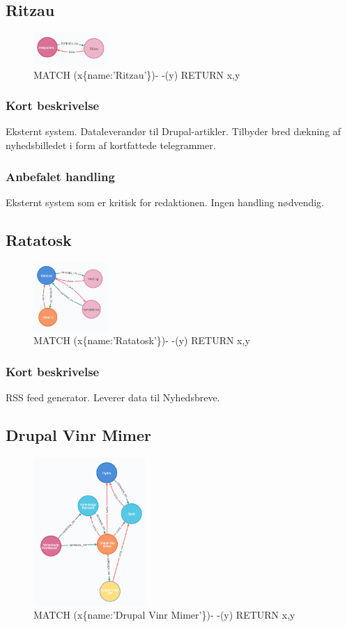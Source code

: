 \documentclass{article}
\begin{document}
\subsection{Ritzau}
\begin{figure}[h]
\includegraphics[width=80pt]{Ritzau.PNG}
\caption{MATCH (x\{name:'Ritzau'\})- -(y) RETURN x,y}
\end{figure}
\subsubsection*{Kort beskrivelse}
Eksternt system. Dataleverandør til Drupal-artikler.
Tilbyder bred dækning af nyhedsbilledet i form af kortfattede telegrammer.
\subsubsection*{Anbefalet handling}
Eksternt system som er kritisk for redaktionen. Ingen handling nødvendig.



\subsection{Ratatosk}
\begin{figure}[h]
\includegraphics[width=80pt]{Ratatosk.PNG}
\caption{MATCH (x\{name:'Ratatosk'\})- -(y) RETURN x,y}
\end{figure}
\subsubsection*{Kort beskrivelse}
RSS feed generator. Leverer data til Nyhedsbreve.


\subsection{Drupal Vinr Mimer}
\begin{figure}[h]
\includegraphics[width=120pt]{DrupalVinrMimer.PNG}
\caption{MATCH (x\{name:'Drupal Vinr Mimer'\})- -(y) RETURN x,y}
\end{figure}
\end{document}
